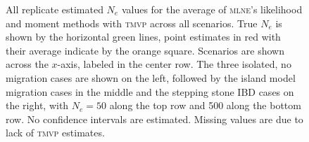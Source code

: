 \begin{landscape}
\begin{figure}[ht]
\centering
{}
\caption[ ~~ - All replicate estimated $N_e$ values for the average of \textsc{mlne}'s likelihood and moment methods with \textsc{tmvp} across all scenarios.]{All replicate estimated $N_e$ values for the average of \textsc{mlne}'s likelihood and moment methods with \textsc{tmvp} across all scenarios. True $N_e$ is shown by the horizontal green lines, point estimates in red with their average indicate by the orange square. Scenarios are shown across the $x$-axis, labeled in the center row. The three isolated, no migration cases are shown on the left, followed by the island model migration cases in the middle and the stepping stone IBD cases on the right, with $N_e = 50$ along the top row and 500 along the bottom row. No confidence intervals are estimated. Missing values are due to lack of \textsc{tmvp} estimates.}
\label{fig:supp_avg4}
\end{figure}



\end{landscape}
